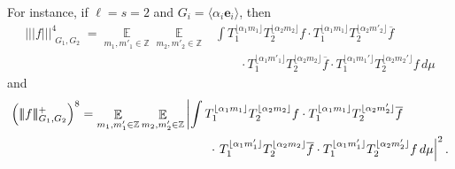 \documentclass[11pt]{amsart}
\theoremstyle{definition}
\DeclareMathOperator*{\E}{\mathbb{E}}
\newcommand{\Z}{{\mathbb Z}}
\newcommand{\be}{{\mathbf{e}}}
\newcommand{\nnorm}[1]{\lvert\!|\!| #1|\!|\!\rvert}
\newcommand{\1}{{\mathbf{1}}}
\newcommand{\Bigbrac}[1]{\Bigl( #1 \Bigr)}
\newcommand{\sfloor}[1]{{\lfloor #1 \rfloor}}
\begin{document}
For instance, if $\ell=s=2$ and $G_i = \langle \alpha_i \be_i\rangle$, then 
\begin{align*}
    \nnorm{f}_{\substack{G_1, G_2}}^4= \E\limits_{m_{1},m'_{1}\in\Z}\E\limits_{m_{2},m'_{2}\in\Z} &\int T_1^{\sfloor{\alpha_1 m_1}}T_2^{\sfloor{\alpha_2 m_2}} f \cdot T_1^{\sfloor{\alpha_1 m_1}}T_2^{\sfloor{\alpha_2 m'_2}}\overline{f}\\
        &\qquad \cdot T_1^{\sfloor{\alpha_1 m'_1}}T_2^{\sfloor{\alpha_2 m_2}}\overline{f}\cdot T_1^{\sfloor{\alpha_1 m_1'}}T_2^{\sfloor{\alpha_2 m_2'}}f\, d\mu
\end{align*}
and
\begin{align*}
    \Bigbrac{\nnorm{f}^+_{\substack{G_1, G_2}}}^8= \E\limits_{m_{1},m'_{1}\in\Z}\E\limits_{m_{2},m'_{2}\in\Z} &\left|\int T_1^{\sfloor{\alpha_1 m_1}}T_2^{\sfloor{\alpha_2 m_2}} f \cdot T_1^{\sfloor{\alpha_1 m_1}}T_2^{\sfloor{\alpha_2 m'_2}}\overline{f}\right.\\
        &\qquad \cdot\left. T_1^{\sfloor{\alpha_1 m'_1}}T_2^{\sfloor{\alpha_2 m_2}}\overline{f}\cdot T_1^{\sfloor{\alpha_1 m_1'}}T_2^{\sfloor{\alpha_2 m_2'}}f\, d\mu\right|^2.
\end{align*}
\end{document}
